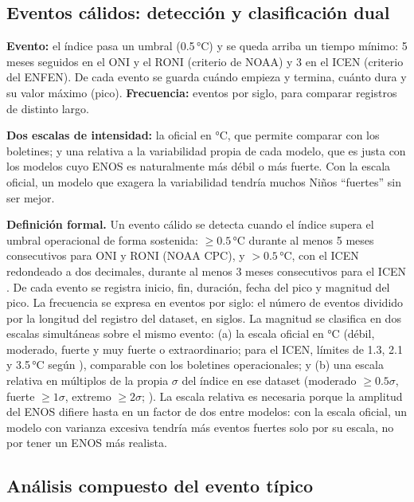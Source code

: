 \documentclass[11pt,a4paper]{article}
\begin{document}
\subsection{Eventos cálidos: detección y clasificación dual}
\label{sec:eventos}

\begin{basico}
\textbf{Evento:} el índice pasa un umbral (0.5\,°C) y se queda arriba un tiempo mínimo: 5 meses seguidos en el ONI y el RONI (criterio de NOAA) y 3 en el ICEN (criterio del ENFEN). De cada evento se guarda cuándo empieza y termina, cuánto dura y su valor máximo (pico). \textbf{Frecuencia:} eventos por siglo, para comparar registros de distinto largo.

\textbf{Dos escalas de intensidad:} la oficial en °C, que permite comparar con los boletines; y una relativa a la variabilidad propia de cada modelo, que es justa con los modelos cuyo ENOS es naturalmente más débil o más fuerte. Con la escala oficial, un modelo que exagera la variabilidad tendría muchos Niños ``fuertes'' sin ser mejor.
\end{basico}

\noindent\textbf{Definición formal.} Un evento cálido se detecta cuando el índice supera el umbral operacional de forma sostenida: $\geq 0.5$\,°C durante al menos 5 meses consecutivos para ONI y RONI (NOAA CPC), y $> 0.5$\,°C, con el ICEN redondeado a dos decimales, durante al menos 3 meses consecutivos para el ICEN \citep{enfen2024}. De cada evento se registra inicio, fin, duración, fecha del pico y magnitud del pico. La frecuencia se expresa en eventos por siglo: el número de eventos dividido por la longitud del registro del dataset, en siglos. La magnitud se clasifica en dos escalas simultáneas sobre el mismo evento: (a) la escala oficial en °C (débil, moderado, fuerte y muy fuerte o extraordinario; para el ICEN, límites de 1.3, 2.1 y 3.5\,°C según \citealp{enfen2024}), comparable con los boletines operacionales; y (b) una escala relativa en múltiplos de la propia $\sigma$ del índice en ese dataset (moderado $\geq 0.5\sigma$, fuerte $\geq 1\sigma$, extremo $\geq 2\sigma$; \citealp{shin2022}). La escala relativa es necesaria porque la amplitud del ENOS difiere hasta en un factor de dos entre modelos: con la escala oficial, un modelo con varianza excesiva tendría más eventos fuertes solo por su escala, no por tener un ENOS más realista.

\subsection{Análisis compuesto del evento típico}
\label{sec:compuesto}
\end{document}
